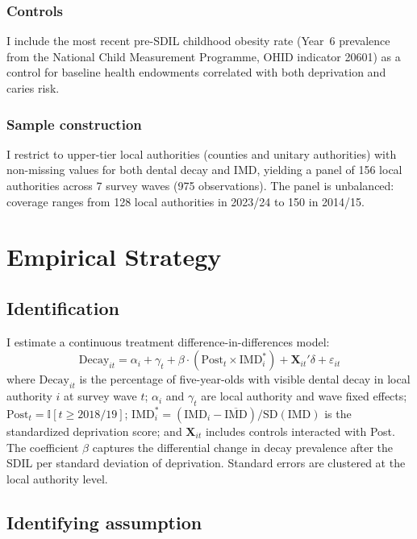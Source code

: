 \documentclass[12pt]{article}
\newcommand{\ind}{\mathbb{I}}
\begin{document}
\subsubsection*{Controls} I include the most recent pre-SDIL childhood obesity rate (Year~6 prevalence from the National Child Measurement Programme, OHID indicator 20601) as a control for baseline health endowments correlated with both deprivation and caries risk.

\subsubsection*{Sample construction} I restrict to upper-tier local authorities (counties and unitary authorities) with non-missing values for both dental decay and IMD, yielding a panel of 156 local authorities across 7 survey waves (975 observations). The panel is unbalanced: coverage ranges from 128 local authorities in 2023/24 to 150 in 2014/15.




\section{Empirical Strategy}

\subsection{Identification}

I estimate a continuous treatment difference-in-differences model:
\begin{equation}
\text{Decay}_{it} = \alpha_i + \gamma_t + \beta \cdot (\text{Post}_t \times \text{IMD}_i^*) + \mathbf{X}_{it}'\delta + \varepsilon_{it}
\label{eq:did}
\end{equation}
where $\text{Decay}_{it}$ is the percentage of five-year-olds with visible dental decay in local authority $i$ at survey wave $t$; $\alpha_i$ and $\gamma_t$ are local authority and wave fixed effects; $\text{Post}_t = \ind[t \geq 2018/19]$; $\text{IMD}_i^* = (\text{IMD}_i - \overline{\text{IMD}}) / \text{SD}(\text{IMD})$ is the standardized deprivation score; and $\mathbf{X}_{it}$ includes controls interacted with Post. The coefficient $\beta$ captures the differential change in decay prevalence after the SDIL per standard deviation of deprivation. Standard errors are clustered at the local authority level.

\subsection{Identifying assumption}
\end{document}
